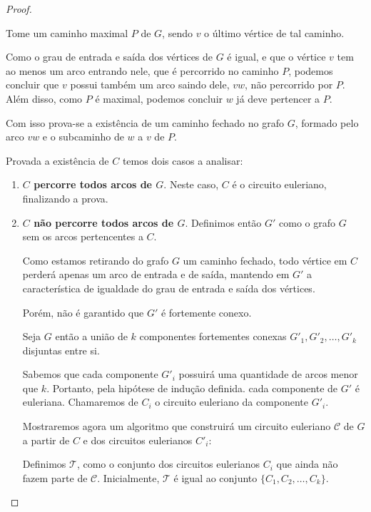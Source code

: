 \documentclass[12pt, a4paper]{article}
\begin{document}
\begin{proof}
\begin{tcolorbox}
        Tome um caminho maximal $P$ de $G$, sendo $v$ o último vértice de tal caminho.

        Como o grau de entrada e saída dos vértices de $G$ é igual, e que o vértice $v$ tem ao menos um arco entrando nele, que é percorrido no caminho $P$, podemos concluir que $v$ possui também um arco saindo dele, $vw$, não percorrido por $P$.
        Além disso, como $P$ é maximal, podemos concluir $w$ já deve pertencer a $P$.

        Com isso prova-se a existência de um caminho fechado no grafo $G$, formado pelo arco $vw$ e o subcaminho de $w$ a $v$ de $P$.
    \end{tcolorbox}

    Provada a existência de $C$ temos dois casos a analisar:

    \begin{enumerate}
        \item \textbf{$C$ percorre todos arcos de $G$}.
            Neste caso, $C$ é o circuito euleriano, finalizando a prova.

        \item \textbf{$C$ não percorre todos arcos de $G$}.
            Definimos então $G'$ como o grafo $G$ sem os arcos pertencentes a $C$.

            Como estamos retirando do grafo $G$ um caminho fechado, todo vértice em $C$ perderá apenas um arco de entrada e de saída, mantendo em $G'$ a característica de igualdade do grau de entrada e saída dos vértices.

            Porém, não é garantido que $G'$ é fortemente conexo. 

            \sloppy Seja $G$ então a união de $k$ componentes fortementes conexas $G'_1, G'_2, \dots, G'_k$ disjuntas entre si.

            Sabemos que cada componente $G'_i$ possuirá uma quantidade de arcos menor que $k$. 
            Portanto, pela hipótese de indução definida. cada componente de $G'$ é euleriana.
            Chamaremos de $C_i$ o circuito euleriano da componente $G'_i$.

            Mostraremos agora um algoritmo que construirá um circuito euleriano $\mathcal{C}$ de $G$ a partir de $C$ e dos circuitos eulerianos $C'_i$:


            Definimos $\mathcal{T}$, como o conjunto dos circuitos eulerianos $C_i$ que ainda não fazem parte de $\mathcal{C}$. 
            Inicialmente, $\mathcal{T}$ é igual ao conjunto $\{C_1, C_2, \dots, C_k\}$.



\end{enumerate}
\end{proof}
\end{document}

